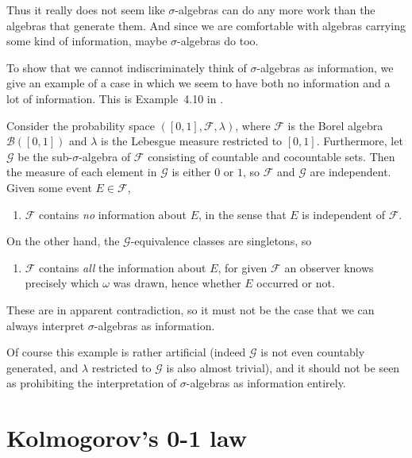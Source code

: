 \documentclass[article, a4paper, 11pt, oneside]{memoir}
\numberwithin{equation}{chapter}
\newcommand{\calB}{\mathcal{B}}
\newcommand{\calF}{\mathcal{F}}
\newcommand{\calG}{\mathcal{G}}
\newcommand{\borel}[1]{\calB(#1)}
\begin{document}
Thus it really does not seem like $\sigma$-algebras can do any more work than the algebras that generate them. And since we are comfortable with algebras carrying some kind of information, maybe $\sigma$-algebras do too.

To show that we cannot indiscriminately think of $\sigma$-algebras as information, we give an example of a case in which we seem to have both no information and a lot of information. This is Example~4.10 in \textcite{billingsley1995}.

\begin{example}
    Consider the probability space $([0,1], \calF, \lambda)$, where $\calF$ is the Borel algebra $\borel{[0,1]}$ and $\lambda$ is the Lebesgue measure restricted to $[0,1]$. Furthermore, let $\calG$ be the sub-$\sigma$-algebra of $\calF$ consisting of countable and cocountable sets. Then the measure of each element in $\calG$ is either $0$ or $1$, so $\calF$ and $\calG$ are independent. Given some event $E \in \calF$,
    \begin{enumerate}[label=\normalfont(\alph*)]
        \item $\calF$ contains \emph{no} information about $E$, in the sense that $E$ is independent of $\calF$.
    \end{enumerate}
    On the other hand, the $\calG$-equivalence classes are singletons, so
    \begin{enumerate}[resume, label=\normalfont(\alph*)]
        \item $\calF$ contains \emph{all} the information about $E$, for given $\calF$ an observer knows precisely which $\omega$ was drawn, hence whether $E$ occurred or not.
    \end{enumerate}
    These are in apparent contradiction, so it must not be the case that we can always interpret $\sigma$-algebras as information.

    Of course this example is rather artificial (indeed $\calG$ is not even countably generated, and $\lambda$ restricted to $\calG$ is also almost trivial), and it should not be seen as prohibiting the interpretation of $\sigma$-algebras as information entirely.
\end{example}


\section{Kolmogorov's 0-1 law}
\end{document}
